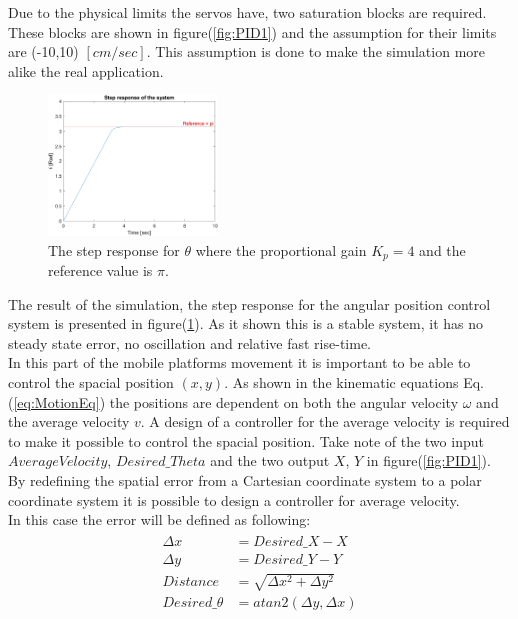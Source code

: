 Due to the physical limits the servos have, two saturation blocks are required.
These blocks are shown in figure(\ref{fig:PID1}) and the assumption for their limits are (-10,10) $[cm/sec]$. 
This assumption is done to make the simulation more alike the real application.\\
\begin{figure}[ht]
\centering
\includegraphics[width=0.4\textwidth]{sections/assets/Theta_pi_stepresponce.png}
\caption{The step response for $\theta$ where the proportional gain $K_p = 4$ and the reference value is $\pi$.}
\label{fig:Theta_Step}
\end{figure}

The result of the simulation, the step response for the angular position control system is presented in figure(\ref{fig:Theta_Step}).
As it shown this is a stable system, it has no steady state error, no oscillation and relative fast rise-time.\\

In this part of the mobile platforms movement it is important to be able to control the spacial position $(x, y)$. 
As shown in the kinematic equations Eq.(\ref{eq:MotionEq}) the positions are dependent on both the angular velocity $\omega$ and the average velocity $v$. 
A design of a controller for the average velocity is required to make it possible to control the spacial position. 
Take note of the two input $AverageVelocity$, $Desired\_Theta$ and the two output $X$, $Y$ in figure(\ref{fig:PID1}).\\

By redefining the spatial error from a Cartesian coordinate system to a polar coordinate system it is possible to design a controller for average velocity.\\
In this case the error will be defined as following:
\begin{eqnarray}
\begin{aligned}
\Delta x &= Desired\_X - X\\
\Delta y &= Desired\_Y - Y\\
Distance &= \sqrt{\Delta x^2 + \Delta y^2}\\
Desired\_\theta &= atan2(\Delta y, \Delta x)
\end{aligned}
\label{eq:cart2polar}
\end{eqnarray}
\\

